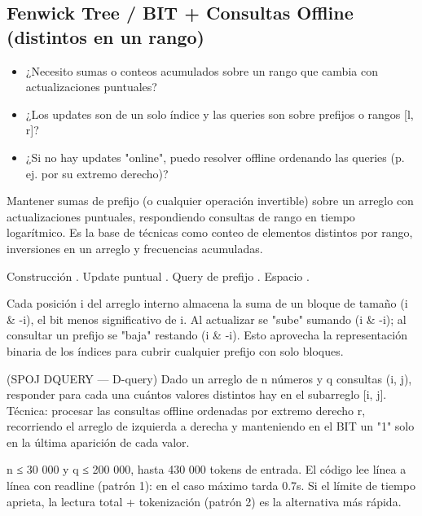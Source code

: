 \subsection{Fenwick Tree / BIT + Consultas Offline (distintos en un rango)}
\label{alg:3-1}


\begin{itemize}
\item ¿Necesito sumas o conteos acumulados sobre un rango que cambia con actualizaciones puntuales?
\item ¿Los updates son de un solo índice y las queries son sobre prefijos o rangos [l, r]?
\item ¿Si no hay updates "online", puedo resolver offline ordenando las queries (p. ej. por su extremo derecho)?
\end{itemize}

 Mantener sumas de prefijo (o cualquier operación invertible) sobre un arreglo con actualizaciones puntuales, respondiendo consultas de rango en tiempo logarítmico. Es la base de técnicas como conteo de elementos distintos por rango, inversiones en un arreglo y frecuencias acumuladas.

 Construcción . Update puntual . Query de prefijo . Espacio .

 Cada posición i del arreglo interno almacena la suma de un bloque de tamaño (i \& -i), el bit menos significativo de i. Al actualizar se "sube" sumando (i \& -i); al consultar un prefijo se "baja" restando (i \& -i). Esto aprovecha la representación binaria de los índices para cubrir cualquier prefijo con solo  bloques.~\cite{fenwick1994}


(SPOJ DQUERY — D-query) Dado un arreglo de n números y q consultas (i, j), responder para cada una cuántos valores distintos hay en el subarreglo [i, j]. Técnica: procesar las consultas offline ordenadas por extremo derecho r, recorriendo el arreglo de izquierda a derecha y manteniendo en el BIT un "1" solo en la última aparición de cada valor.

 n ≤ 30 000 y q ≤ 200 000, hasta \aprox{}430 000 tokens de entrada. El código lee línea a línea con readline (patrón 1): en el caso máximo tarda \aprox{}0.7s. Si el límite de tiempo aprieta, la lectura total + tokenización (patrón 2) es la alternativa más rápida.

